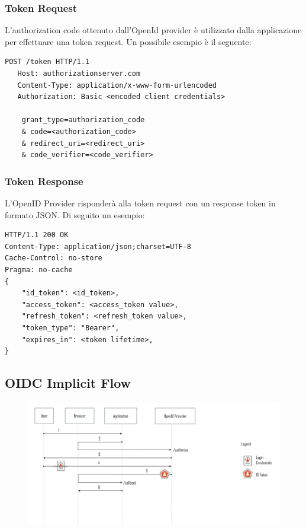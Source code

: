 \subsubsection{Token Request}

L'authorization code ottenuto dall'OpenId provider è utilizzato dalla applicazione
per effettuare una token request. Un possibile esempio è il seguente:

\begin{lstlisting}
POST /token HTTP/1.1
   Host: authorizationserver.com
   Content-Type: application/x-www-form-urlencoded
   Authorization: Basic <encoded client credentials>

    grant_type=authorization_code
    & code=<authorization_code>
    & redirect_uri=<redirect_uri>
    & code_verifier=<code_verifier>
\end{lstlisting}

\subsubsection{Token Response}

L'OpenID Provider risponderà alla token request con un response token in formato
JSON. Di seguito un esempio:

\begin{lstlisting}
HTTP/1.1 200 OK
Content-Type: application/json;charset=UTF-8
Cache-Control: no-store
Pragma: no-cache
{
    "id_token": <id_token>,
    "access_token": <access_token value>,
    "refresh_token": <refresh_token value>,
    "token_type": "Bearer",
    "expires_in": <token lifetime>,
}
\end{lstlisting}

\subsection{OIDC Implicit Flow}

\begin{figure}[H]
      \centering
      \includegraphics[width=\textwidth, keepaspectratio]{capitoli/id_managing/imgs/implicitflow.png}
\end{figure}

